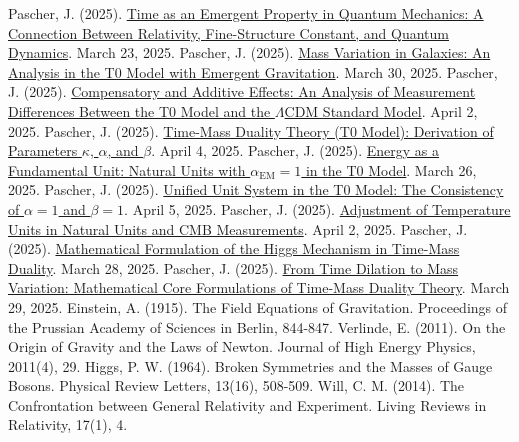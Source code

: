 \documentclass[12pt,a4paper]{article}
\newcommand{\alphaEM}{\alpha_{\text{EM}}}
\begin{document}
	\begin{thebibliography}{9}
		 Pascher, J. (2025). \href{https://github.com/jpascher/T0-Time-Mass-Duality/tree/main/2/pdf/English/ZeitEmergentQMEn.pdf}{Time as an Emergent Property in Quantum Mechanics: A Connection Between Relativity, Fine-Structure Constant, and Quantum Dynamics}. March 23, 2025.
		 Pascher, J. (2025). \href{https://github.com/jpascher/T0-Time-Mass-Duality/tree/main/2/pdf/English/MassVarGalaxienEn.pdf}{Mass Variation in Galaxies: An Analysis in the T0 Model with Emergent Gravitation}. March 30, 2025.
		 Pascher, J. (2025). \href{https://github.com/jpascher/T0-Time-Mass-Duality/tree/main/2/pdf/English/MessdifferenzenT0StandardEn.pdf}{Compensatory and Additive Effects: An Analysis of Measurement Differences Between the T0 Model and the \(\Lambda\)CDM Standard Model}. April 2, 2025.
		 Pascher, J. (2025). \href{https://github.com/jpascher/T0-Time-Mass-Duality/tree/main/2/pdf/English/ZeitMasseT0ParamsEn.pdf}{Time-Mass Duality Theory (T0 Model): Derivation of Parameters \(\kappa\), \(\alpha\), and \(\beta\)}. April 4, 2025.
		 Pascher, J. (2025). \href{https://github.com/jpascher/T0-Time-Mass-Duality/tree/main/2/pdf/English/NatEinheitenAlpha1En.pdf}{Energy as a Fundamental Unit: Natural Units with \(\alphaEM = 1\) in the T0 Model}. March 26, 2025.
		 Pascher, J. (2025). \href{https://github.com/jpascher/T0-Time-Mass-Duality/tree/main/2/pdf/English/Alpha1Beta1KonsistenzEn.pdf}{Unified Unit System in the T0 Model: The Consistency of \(\alpha = 1\) and \(\beta = 1\)}. April 5, 2025.
		 Pascher, J. (2025). \href{https://github.com/jpascher/T0-Time-Mass-Duality/tree/main/2/pdf/English/NatEinheitenAlpha1En.pdf}{Adjustment of Temperature Units in Natural Units and CMB Measurements}. April 2, 2025.
		 Pascher, J. (2025). \href{https://github.com/jpascher/T0-Time-Mass-Duality/tree/main/2/pdf/English/MathHiggsZeitMasseEn.pdf}{Mathematical Formulation of the Higgs Mechanism in Time-Mass Duality}. March 28, 2025.
		 Pascher, J. (2025). \href{https://github.com/jpascher/T0-Time-Mass-Duality/tree/main/2/pdf/English/MathZeitMasseLagrangeEn.pdf}{From Time Dilation to Mass Variation: Mathematical Core Formulations of Time-Mass Duality Theory}. March 29, 2025.
		 Einstein, A. (1915). The Field Equations of Gravitation. Proceedings of the Prussian Academy of Sciences in Berlin, 844-847.
		 Verlinde, E. (2011). On the Origin of Gravity and the Laws of Newton. Journal of High Energy Physics, 2011(4), 29.
		 Higgs, P. W. (1964). Broken Symmetries and the Masses of Gauge Bosons. Physical Review Letters, 13(16), 508-509.
		 Will, C. M. (2014). The Confrontation between General Relativity and Experiment. Living Reviews in Relativity, 17(1), 4.
	\end{thebibliography}
	
\end{document}
